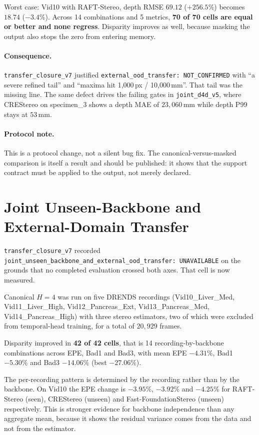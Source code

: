 \documentclass[11pt,a4paper]{article}
\begin{document}
Worst case: Vid10 with RAFT-Stereo, depth RMSE $69.12$ ($+256.5\%$)
becomes $18.74$ ($-3.4\%$). Across 14 combinations and 5 metrics,
\textbf{70 of 70 cells are equal or better and none regress}.
Disparity improves as well, because masking the output also stops the
zero from entering memory.

\paragraph{Consequence.}
\texttt{transfer\_closure\_v7} justified
\texttt{external\_ood\_transfer: NOT\_CONFIRMED} with ``a severe
refined tail'' and ``maxima hit 1{,}000\,px / 10{,}000\,mm''. That
tail was the missing line. The same defect drives the failing gates in
\texttt{joint\_d4d\_v5}, where CREStereo on specimen\_3 shows a depth
MAE of $23{,}060$\,mm while depth P99 stays at $53$\,mm.

\paragraph{Protocol note.}
This is a protocol change, not a silent bug fix. The
canonical-versus-masked comparison is itself a result and should be
published: it shows that the support contract must be applied to the
output, not merely declared.

\section*{Joint Unseen-Backbone and External-Domain Transfer}

\texttt{transfer\_closure\_v7} recorded
\texttt{joint\_unseen\_backbone\_and\_external\_ood\_transfer:
UNAVAILABLE} on the grounds that no completed evaluation crossed both
axes. That cell is now measured.

Canonical $H=4$ was run on five DRENDS recordings
(Vid10\_Liver\_Med, Vid11\_Liver\_High, Vid12\_Pancreas\_Ext,
Vid13\_Pancreas\_Med, Vid14\_Pancreas\_High) with three stereo
estimators, two of which were excluded from temporal-head training,
for a total of $20{,}929$ frames.

Disparity improved in \textbf{42 of 42 cells}, that is 14
recording-by-backbone combinations across EPE, Bad1 and Bad3, with
mean EPE $-4.31\%$, Bad1 $-5.30\%$ and Bad3 $-14.06\%$ (best
$-27.06\%$).

The per-recording pattern is determined by the recording rather than
by the backbone. On Vid10 the EPE change is $-3.95\%$, $-3.92\%$ and
$-4.25\%$ for RAFT-Stereo (seen), CREStereo (unseen) and
Fast-FoundationStereo (unseen) respectively. This is stronger evidence
for backbone independence than any aggregate mean, because it shows
the residual variance comes from the data and not from the estimator.
\end{document}

